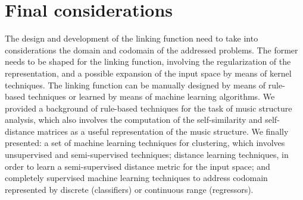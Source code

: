 \section{Final considerations}
The design and development of the linking function need to take into considerations the domain and codomain of the addressed problems. The former needs to be shaped for the linking function, involving the regularization of the representation, and a possible expansion of the input space by means of kernel techniques. The linking function can be manually designed by means of rule-based techniques or learned by means of machine learning algorithms. We provided a background of rule-based techniques for the task of music structure analysis, which also involves the computation of the self-similarity and self-distance matrices as a useful representation of the music structure. We finally presented: a set of machine learning techniques for clustering, which involves unsupervised and semi-supervised techniques; distance learning techniques, in order to learn a semi-supervised distance metric for the input space; and completely supervised machine learning techniques to address codomain represented by discrete (classifiers) or continuous range (regressors).

